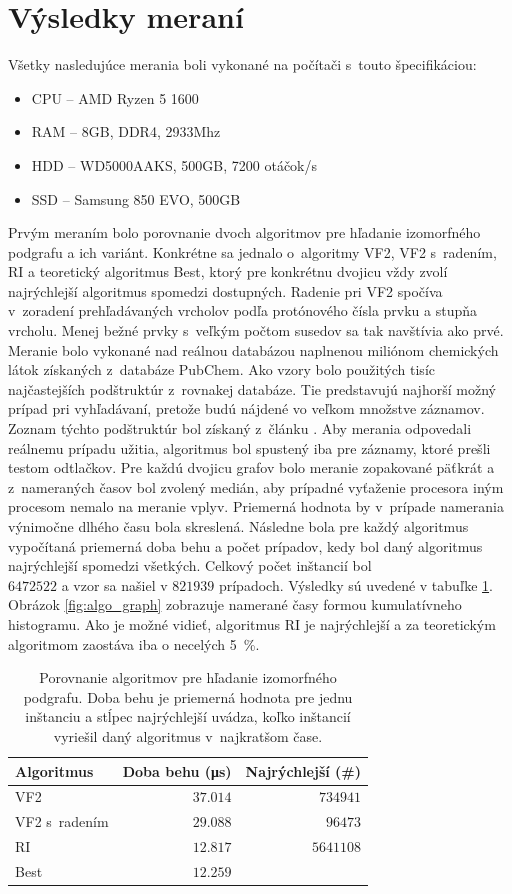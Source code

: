 \documentclass[slovak]{ExcelAtFIT} %
\begin{document}
\section{Výsledky meraní}
\label{sec:Results}
Všetky nasledujúce merania boli vykonané na počítači s~touto špecifikáciou:
\begin{itemize}
	\item CPU -- AMD Ryzen 5 1600
	\item RAM -- 8GB, DDR4, 2933Mhz
	\item HDD -- WD5000AAKS, 500GB, 7200 otáčok/s
	\item SSD -- Samsung 850 EVO, 500GB
\end{itemize}
Prvým meraním bolo porovnanie dvoch algoritmov pre hľadanie izomorfného podgrafu a ich variánt. Konkré\-tne sa jednalo o~algoritmy VF2, VF2 s~radením, RI a teoretický algoritmus Best, ktorý pre konkrétnu dvojicu vždy zvolí najrýchlejší algoritmus spomedzi dostupných. Radenie pri VF2 spočíva v~zoradení pre\-hľa\-dá\-va\-ný\-ch vrcholov podľa protónového čísla prvku a stupňa vrcholu. Menej bežné prvky s~veľkým počtom susedov sa tak navštívia ako prvé. Meranie bolo vykonané nad reálnou databázou naplnenou miliónom chemických látok získaných z~databáze PubChem. Ako vzory bolo použitých tisíc najčastejších podštruktúr z~rovnakej databáze. Tie predstavujú najhorší možný prípad pri vyhľadávaní, pretože budú nájdené vo veľ\-kom množstve záznamov. Zoznam týchto podštruktúr bol získaný z~článku \cite{mol_cloud}. Aby merania odpovedali reálnemu prípadu užitia, algoritmus bol spustený iba pre záznamy, ktoré prešli testom odtlačkov. Pre každú dvojicu grafov bolo meranie zopakované päťkrát a z~nameraných časov bol zvolený medián, aby prípadné vyťaženie procesora iným procesom nemalo na meranie vplyv. Priemerná hodnota by v~prípade namerania výnimočne dlhého času bola skreslená. Následne bola pre každý algoritmus vypočítaná priemerná doba behu a počet prípadov, kedy bol daný algoritmus najrýchlejší spomedzi všet\-kých. Celkový počet inštancií bol\\$6472522$ a vzor sa našiel v $821939$ prípadoch. Výsledky sú uvedené v tabuľke \ref{tab:algo_meas}. Obrázok \ref{fig:algo_graph} zobrazuje namerané časy formou kumulatívneho histogramu. Ako je možné vidieť, algoritmus RI je najrýchlejší a za teoretickým algoritmom zaostáva iba o necelých \SI{5}{\percent}.

\begin{table}[h]
	\vskip6pt
	\caption{Porovnanie algoritmov pre hľadanie izomorfného podgrafu. Doba behu je priemerná hodnota pre jednu inštanciu a stĺpec najrýchlejší uvádza, koľko inštancií vyriešil daný algoritmus v~najkratšom čase.}
	\centering
	\begin{tabular}{l|r|r}
		\toprule
		Algoritmus & Doba behu (\si{\micro \second}) & Najrýchlejší (\#)\\
		\midrule
		VF2 & $37.014$ & $734941$ \\
		VF2 s~radením & $29.088$ & $96473$ \\
		RI & $12.817$ & $5641108$ \\
		Best & $12.259$ & \\
		\bottomrule
	\end{tabular}
	\label{tab:algo_meas}
\end{table}
\end{document}
